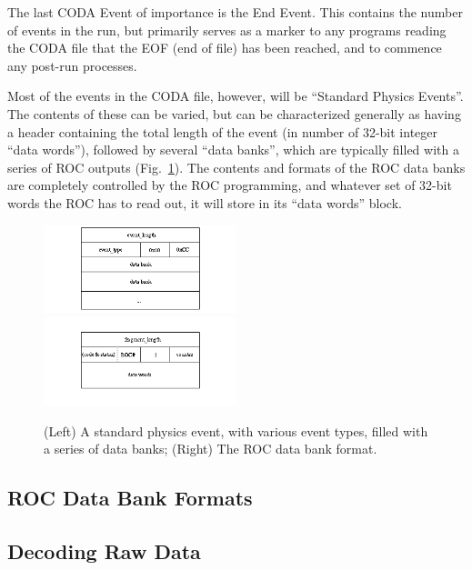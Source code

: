 The last CODA Event of importance is the End Event. This contains the number of events in the run, but primarily serves as a marker to any programs reading the CODA file that the EOF (end of file) has been reached, and to commence any post-run processes.

Most of the events in the CODA file, however, will be ``Standard Physics Events''. The contents of these can be varied, but can be characterized generally as having a header containing the total length of the event (in number of 32-bit integer ``data words''), followed by several ``data banks'', which are typically filled with a series of ROC outputs (Fig.~\ref{fig:coda-physics-roc}). The contents and formats of the ROC data banks are completely controlled by the ROC programming, and whatever set of 32-bit words the ROC has to read out, it will store in its ``data words'' block. 

\begin{figure}
	\centerline{
		\mbox{\includegraphics[width=0.5\textwidth]{figures/production/physics_event.png} \includegraphics[width=0.5\textwidth]{figures/production/roc_event.png}}
	}
	\caption{(Left) A standard physics event, with various event types, filled with a series of data banks; (Right) The ROC data bank format\cite{jlab:coda}.}
	\label{fig:coda-physics-roc}
\end{figure}

\subsection{ROC Data Bank Formats}



\subsection{Decoding Raw Data}

